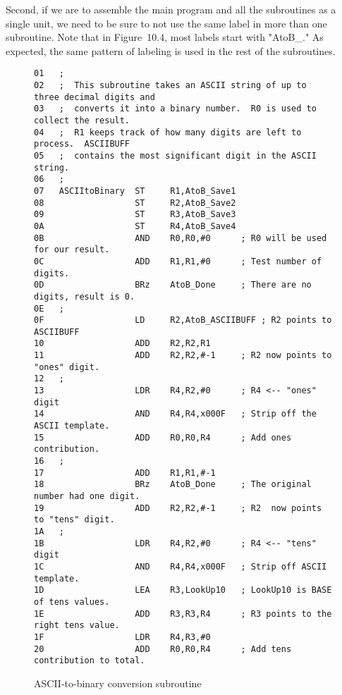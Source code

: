 \documentclass{patt}
\begin{document}
Second, if we are to assemble the main program and all the subroutines as a
single unit, we need to be sure to not use the same label in more than one 
subroutine.  Note that in Figure~10.4, most labels start with "AtoB\_."  
As expected, the same pattern of labeling is used in the rest of the 
subroutines.

\begin{figure}
\begin{Verbatim}[fontsize=\fontsize{9}{11}\selectfont]
01   ;
02   ;  This subroutine takes an ASCII string of up to three decimal digits and
03   ;  converts it into a binary number.  R0 is used to collect the result.
04   ;  R1 keeps track of how many digits are left to process.  ASCIIBUFF
05   ;  contains the most significant digit in the ASCII string.
06   ;
07   ASCIItoBinary  ST     R1,AtoB_Save1
08                  ST     R2,AtoB_Save2
09                  ST     R3,AtoB_Save3
0A                  ST     R4,AtoB_Save4
0B                  AND    R0,R0,#0      ; R0 will be used for our result.
0C                  ADD    R1,R1,#0      ; Test number of digits.
0D                  BRz    AtoB_Done     ; There are no digits, result is 0.
0E   ;
0F                  LD     R2,AtoB_ASCIIBUFF ; R2 points to ASCIIBUFF
10                  ADD    R2,R2,R1
11                  ADD    R2,R2,#-1     ; R2 now points to "ones" digit.
12   ;
13                  LDR    R4,R2,#0      ; R4 <-- "ones" digit
14                  AND    R4,R4,x000F   ; Strip off the ASCII template.
15                  ADD    R0,R0,R4      ; Add ones contribution.
16   ;
17                  ADD    R1,R1,#-1
18                  BRz    AtoB_Done     ; The original number had one digit.
19                  ADD    R2,R2,#-1     ; R2  now points to "tens" digit.
1A   ;
1B                  LDR    R4,R2,#0      ; R4 <-- "tens" digit
1C                  AND    R4,R4,x000F   ; Strip off ASCII template.
1D                  LEA    R3,LookUp10   ; LookUp10 is BASE of tens values.
1E                  ADD    R3,R3,R4      ; R3 points to the right tens value.
1F                  LDR    R4,R3,#0
20                  ADD    R0,R0,R4      ; Add tens contribution to total.
\end{Verbatim}
\caption{ASCII-to-binary conversion subroutine}
\label{fig:code.ascii.to.binary}
\end{figure}
\newpage
\setcounter{figure}{3}
\end{document}
